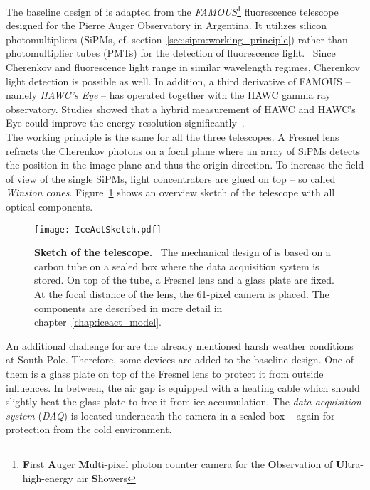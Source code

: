 The baseline design of \iceact is adapted from the \textit{FAMOUS}\footnote{\textbf{F}irst \textbf{A}uger \textbf{M}ulti-pixel photon counter camera for the \textbf{O}bservation of \textbf{U}ltra-high-energy air \textbf{S}howers} fluorescence telescope designed for the Pierre Auger Observatory in Argentina. It utilizes silicon photomultipliers (SiPMs, cf. section~\ref{sec:sipm:working_principle}) rather than photomultiplier tubes (PMTs) for the detection of fluorescence light.~\cite{famous:telescope} Since Cherenkov and fluorescence light range in similar wavelength regimes, Cherenkov light detection is possible as well. In addition, a third derivative of FAMOUS -- namely \textit{HAWC's Eye} -- has operated together with the HAWC gamma ray observatory. Studies showed that a hybrid measurement of HAWC and HAWC's Eye could improve the energy resolution significantly~\cite{hawcseye:merlin}.\\

The working principle is the same for all the three telescopes. A Fresnel lens refracts the Cherenkov photons on a focal plane where an array of SiPMs detects the position in the image plane and thus the origin direction. To increase the field of view of the single SiPMs, light concentrators are glued on top -- so called \textit{Winston cones}. Figure~\ref{iceact:sketch} shows an overview sketch of the \iceact telescope with all optical components.\\

\begin{figure}[H]
	\centering
	\texttt{[image: IceActSketch.pdf]}
	\caption[Sketch of the \iceact telescope]{\textbf{Sketch of the \iceact telescope.}~\cite{iceact:erik} The mechanical design of \iceact is based on a carbon tube on a sealed box where the data acquisition system is stored. On top of the tube, a Fresnel lens and a glass plate are fixed. At the focal distance of the lens, the \num{61}-pixel camera is placed. The components are described in more detail in chapter~\ref{chap:iceact_model}.}
	\label{iceact:sketch}
\end{figure}

An additional challenge for \iceact are the already mentioned harsh weather conditions at South Pole. Therefore, some devices are added to the baseline design. One of them is a glass plate on top of the Fresnel lens to protect it from outside influences. In between, the air gap is equipped with a heating cable which should slightly heat the glass plate to free it from ice accumulation. The \textit{data acquisition system} (\textit{DAQ}) is located underneath the camera in a sealed box -- again for protection from the cold environment.\\


